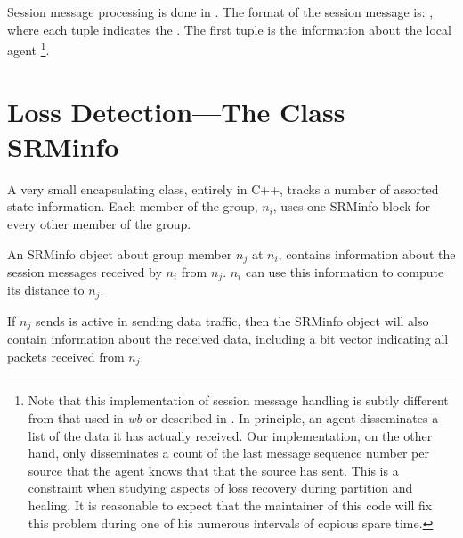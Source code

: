 {Session message processing is done in
.
The format of the session message is:
,
where each tuple indicates the
.
The first tuple is the information about the local agent%
\footnote{Note that this implementation of session message handling
  is subtly different from that used in \emph{wb} or described in
  \cite{Floy95:Reliable}.
  In principle, an agent disseminates a list of the data it has
  actually received.
  Our implementation, on the other hand, only disseminates
  a count of the last message sequence number per source that the
  agent knows that that the source has sent.
  This is a constraint when studying aspects of loss recovery
  during partition and healing.
  It is reasonable to expect that the maintainer of this code will fix
  this problem during one of his numerous intervals of copious spare time.}.

\section{Loss Detection---The Class SRMinfo}
\label{sec:srminfo}

A very small encapsulating class, entirely in C++,
tracks a number of assorted state information.
Each member of the group, $n_i$,  uses one SRMinfo block for every other
member of the group.

An SRMinfo object about group member $n_j$ at $n_i$,
contains information about the session messages
received by $n_i$ from $n_j$.
$n_i$ can use this information to compute its distance to $n_j$.

If $n_j$ sends is active in sending data traffic, then
the SRMinfo object will also contain information about the
received data, including a bit vector indicating all packets
received from $n_j$.

}
